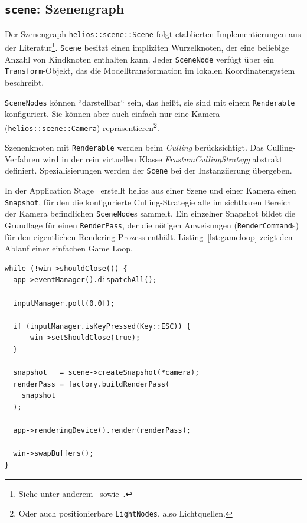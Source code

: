 \subsection*{\texttt{scene}: Szenengraph}
Der Szenengraph \texttt{helios::scene::Scene} folgt etablierten Implementierungen aus der Literatur\footnote{Siehe unter anderem~\cite[]{She07} sowie~\cite[]{Gre19}.}.
\texttt{Scene} besitzt einen impliziten Wurzelknoten, der eine beliebige Anzahl von Kindknoten enthalten kann.
Jeder \texttt{SceneNode} verfügt über ein \texttt{Transform}-Objekt, das die Modelltransformation im lokalen Koordinatensystem beschreibt.\par
\texttt{SceneNodes} können ``darstellbar`` sein, das heißt, sie sind mit einem \texttt{Renderable} konfiguriert.
Sie können aber auch einfach nur eine Kamera (\texttt{helios::scene::Camera}) repräsentieren\footnote{Oder auch positionierbare \texttt{LightNodes}, also Lichtquellen.}.\par
Szenenknoten mit \texttt{Renderable} werden beim \textit{Culling} berücksichtigt.
Das Culling-Verfahren wird in der rein virtuellen Klasse \textit{FrustumCullingStrategy} abstrakt definiert. Spezialisierungen werden der \texttt{Scene} bei der Instanziierung übergeben.\par
In der Application Stage~\cite[687]{Gre19} erstellt helios aus einer Szene und einer Kamera einen \texttt{Snapshot}, für den die konfigurierte Culling-Strategie alle im sichtbaren Bereich der Kamera befindlichen \texttt{SceneNode}s sammelt.
Ein einzelner Snapshot bildet die Grundlage für einen \texttt{RenderPass}, der die nötigen Anweisungen (\texttt{RenderCommand}s) für den eigentlichen Rendering-Prozess enthält.
Listing~\ref{lst:gameloop} zeigt den Ablauf einer einfachen Game Loop.


\begin{lstlisting}[style=c++style, caption={Implementierung einer einfachen Game Loop in helios. Von der Szene wird ein \texttt{Snapshot} erstellt, der als Grundlage für den \texttt{RenderPass} dient.}, label=lst:gameloop]
while (!win->shouldClose()) {
  app->eventManager().dispatchAll();

  inputManager.poll(0.0f);

  if (inputManager.isKeyPressed(Key::ESC)) {
      win->setShouldClose(true);
  }

  snapshot   = scene->createSnapshot(*camera);
  renderPass = factory.buildRenderPass(
    snapshot
  );

  app->renderingDevice().render(renderPass);

  win->swapBuffers();
}
\end{lstlisting}



